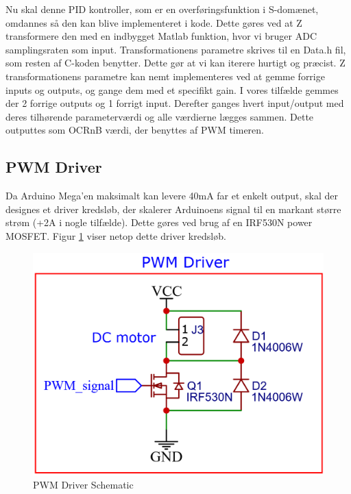 \documentclass[../main.tex]{subfiles}
\begin{document}
Nu skal denne PID kontroller, som er en overføringsfunktion i S-domænet, omdannes så den kan blive implementeret i kode. Dette gøres ved at Z transformere den med en indbygget Matlab funktion, hvor vi bruger ADC samplingsraten som input. Transformationens parametre skrives til en Data.h fil, som resten af C-koden benytter. Dette gør at vi kan iterere hurtigt og præcist. Z transformationens parametre kan nemt implementeres ved at gemme forrige inputs og outputs, og gange dem med et specifikt gain. I vores tilfælde gemmes der 2 forrige outputs og 1 forrigt input. Derefter ganges hvert input/output med deres tilhørende parameterværdi og alle værdierne lægges sammen. Dette outputtes som OCRnB værdi, der benyttes af PWM timeren.

\subsection{PWM Driver}
Da Arduino Mega'en maksimalt kan levere 40mA far et enkelt output, skal der designes et driver kredsløb, der skalerer Arduinoens signal til en markant større strøm (+2A i nogle tilfælde). Dette gøres ved brug af en IRF530N power MOSFET. Figur \ref{fig: PWM Driver Schematic} viser netop dette driver kredsløb.
\begin{figure}[H]
      \includegraphics[width=\textwidth]{Dokumentation/Figures/PWM_Driver.png}
     \caption{PWM Driver Schematic}
     \label{fig: PWM Driver Schematic}
     \end{figure}
\end{document}
